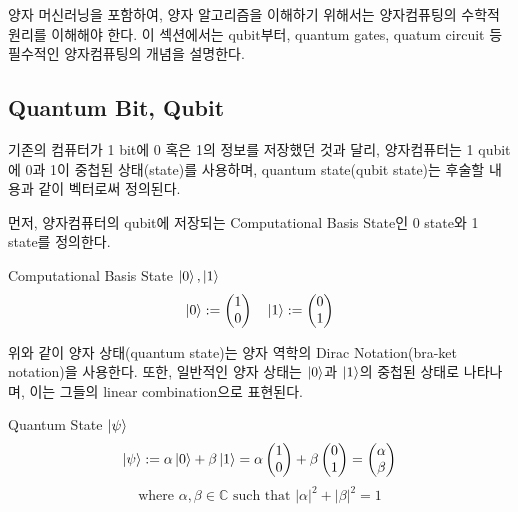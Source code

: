 양자 머신러닝을 포함하여, 양자 알고리즘을 이해하기 위해서는 양자컴퓨팅의 수학적 원리를 이해해야 한다. 이 섹션에서는 qubit부터, quantum gates, quatum circuit 등 필수적인 양자컴퓨팅의 개념을 설명한다.

\subsection{Quantum Bit, Qubit}


기존의 컴퓨터가 1 bit에 0 혹은 1의 정보를 저장했던 것과 달리, 양자컴퓨터는 1 qubit에 0과 1이 중첩된 상태(state)를 사용하며, quantum state(qubit state)는 후술할 내용과 같이 벡터로써 정의된다.

\noindent 먼저, 양자컴퓨터의 qubit에 저장되는 Computational Basis State인 0 state와 1 state를 정의한다.

\begin{definition}
Computational Basis State \( \ket{0}, \ket{1} \)
\[
    \ket{0} := \begin{pmatrix} 1 \\ 0 \end{pmatrix} \quad
    \ket{1} := \begin{pmatrix} 0 \\ 1 \end{pmatrix}
\]
\end{definition}

\noindent 위와 같이 양자 상태(quantum state)는 양자 역학의 Dirac Notation(bra-ket notation)을 사용한다. 또한, 일반적인 양자 상태는 \(\ket{0}\)과 \(\ket{1}\)의 중첩된 상태로 나타나며, 이는 그들의 linear combination으로 표현된다.

\begin{definition}
 Quantum State \( \ket{\psi} \)
\[
    \ket{\psi} := \alpha \ket{0} + \beta \ket{1} = \alpha \begin{pmatrix} 1 \\ 0 \end{pmatrix} + \beta \begin{pmatrix} 0 \\ 1 \end{pmatrix} = \begin{pmatrix} \alpha \\ \beta \end{pmatrix}
\]
\[
    \text{where } \alpha, \beta \in \mathbb{C} \text{ such that } |\alpha|^2 + |\beta|^2 = 1
\]
\end{definition}

